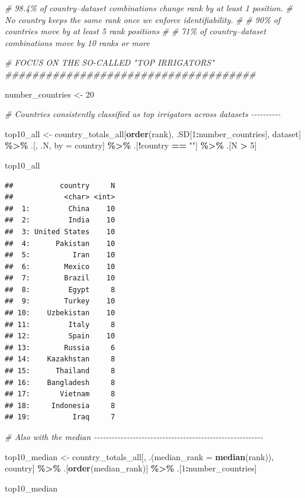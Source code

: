\documentclass[
  11pt,
]{article}
\newenvironment{Shaded}{\begin{snugshade}}{\end{snugshade}}
\newcommand{\AttributeTok}[1]{\textcolor[rgb]{0.13,0.29,0.53}{#1}}
\newcommand{\CommentTok}[1]{\textcolor[rgb]{0.56,0.35,0.01}{\textit{#1}}}
\newcommand{\DecValTok}[1]{\textcolor[rgb]{0.00,0.00,0.81}{#1}}
\newcommand{\FunctionTok}[1]{\textcolor[rgb]{0.13,0.29,0.53}{\textbf{#1}}}
\newcommand{\NormalTok}[1]{#1}
\newcommand{\OtherTok}[1]{\textcolor[rgb]{0.56,0.35,0.01}{#1}}
\newcommand{\SpecialCharTok}[1]{\textcolor[rgb]{0.81,0.36,0.00}{\textbf{#1}}}
\newcommand{\StringTok}[1]{\textcolor[rgb]{0.31,0.60,0.02}{#1}}
\begin{document}
\begin{Shaded}
\begin{Highlighting}[]
\CommentTok{\# 98.4\% of country–dataset combinations change rank by at least 1 position.}
\CommentTok{\# No country keeps the same rank once we enforce identifiability.}
\CommentTok{\#}
\CommentTok{\# 90\% of countries move by at least 5 rank positions}
\CommentTok{\#}
\CommentTok{\# 71\% of country–dataset combinations move by 10 ranks or more}

\CommentTok{\# FOCUS ON THE SO{-}CALLED "TOP IRRIGATORS" \#\#\#\#\#\#\#\#\#\#\#\#\#\#\#\#\#\#\#\#\#\#\#\#\#\#\#\#\#\#\#\#\#\#\#\#\#}

\NormalTok{number\_countries }\OtherTok{\textless{}{-}} \DecValTok{20}

\CommentTok{\# Countries consistently classified as top irrigators across datasets {-}{-}{-}{-}{-}{-}{-}{-}{-}{-}}

\NormalTok{top10\_all }\OtherTok{\textless{}{-}}\NormalTok{ country\_totals\_all[}\FunctionTok{order}\NormalTok{(rank), .SD[}\DecValTok{1}\SpecialCharTok{:}\NormalTok{number\_countries], dataset] }\SpecialCharTok{\%\textgreater{}\%}
\NormalTok{  .[, .N, by }\OtherTok{=}\NormalTok{ country] }\SpecialCharTok{\%\textgreater{}\%}
\NormalTok{  .[}\SpecialCharTok{!}\NormalTok{country }\SpecialCharTok{==} \StringTok{""}\NormalTok{] }\SpecialCharTok{\%\textgreater{}\%}
\NormalTok{  .[N }\SpecialCharTok{\textgreater{}} \DecValTok{5}\NormalTok{]}

\NormalTok{top10\_all}
\end{Highlighting}
\end{Shaded}

\begin{verbatim}
##           country     N
##            <char> <int>
##  1:         China    10
##  2:         India    10
##  3: United States    10
##  4:      Pakistan    10
##  5:          Iran    10
##  6:        Mexico    10
##  7:        Brazil    10
##  8:         Egypt     8
##  9:        Turkey    10
## 10:    Uzbekistan    10
## 11:         Italy     8
## 12:         Spain    10
## 13:        Russia     6
## 14:    Kazakhstan     8
## 15:      Thailand     8
## 16:    Bangladesh     8
## 17:       Vietnam     8
## 18:     Indonesia     8
## 19:          Iraq     7
\end{verbatim}

\begin{Shaded}
\begin{Highlighting}[]
\CommentTok{\# Also with the median {-}{-}{-}{-}{-}{-}{-}{-}{-}{-}{-}{-}{-}{-}{-}{-}{-}{-}{-}{-}{-}{-}{-}{-}{-}{-}{-}{-}{-}{-}{-}{-}{-}{-}{-}{-}{-}{-}{-}{-}{-}{-}{-}{-}{-}{-}{-}{-}{-}{-}{-}{-}{-}{-}{-}{-}{-}}

\NormalTok{top10\_median }\OtherTok{\textless{}{-}}\NormalTok{ country\_totals\_all[, .(}\AttributeTok{median\_rank =} \FunctionTok{median}\NormalTok{(rank)), country] }\SpecialCharTok{\%\textgreater{}\%}
\NormalTok{  .[}\FunctionTok{order}\NormalTok{(median\_rank)] }\SpecialCharTok{\%\textgreater{}\%}
\NormalTok{  .[}\DecValTok{1}\SpecialCharTok{:}\NormalTok{number\_countries]}

\NormalTok{top10\_median}
\end{Highlighting}
\end{Shaded}
\end{document}
